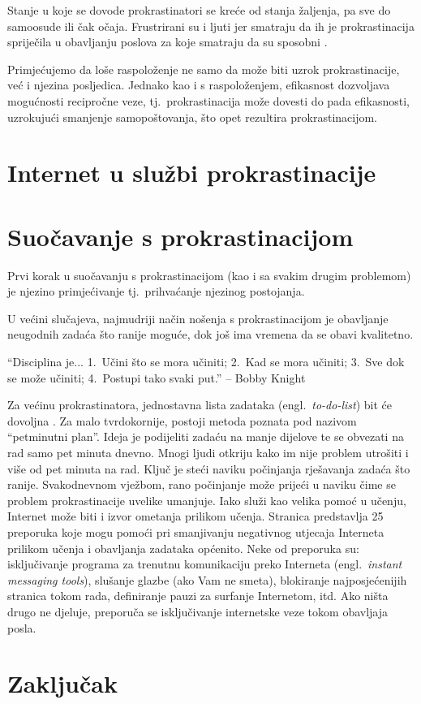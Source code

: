 \documentclass[11pt,twocolumn,english]{article}
\newcommand{\engl}[1]{(engl.~\emph{#1})}
\begin{document}
Stanje u koje se dovode prokrastinatori se kreće od
stanja žaljenja, pa sve do samoosude ili čak očaja. Frustrirani su i ljuti jer
smatraju da ih je prokrastinacija spriječila u obavljanju poslova za koje
smatraju da su sposobni \cite{burka2004procrastination}.

Primjećujemo da loše raspoloženje ne samo da može biti
uzrok prokrastinacije, već i njezina posljedica. Jednako kao i s raspoloženjem,
efikasnost dozvoljava mogućnosti recipročne veze, tj.~prokrastinacija može
dovesti do pada efikasnosti, uzrokujući smanjenje samopoštovanja, što opet
rezultira prokrastinacijom.


\section{Internet u službi prokrastinacije}


\section{Suočavanje s prokrastinacijom}

Prvi korak u suočavanju s prokrastinacijom (kao i sa svakim drugim problemom)
je njezino primjećivanje tj.~prihvaćanje njezinog postojanja. 

U većini slučajeva, najmudriji način nošenja s prokrastinacijom je obavljanje
neugodnih zadaća što ranije moguće, dok još ima vremena da se obavi kvalitetno.

``Disciplina je... 1.~Učini što se mora učiniti; 2.~Kad se mora učiniti; 3.~Sve
dok se može učiniti; 4.~Postupi tako svaki put.'' -- Bobby Knight  

Za većinu prokrastinatora, jednostavna lista zadataka \engl{to-do-list}
bit će dovoljna \cite{TuckerPsySelfHelp}. Za malo tvrdokornije, postoji metoda
poznata pod nazivom ``petminutni plan''. Ideja je podijeliti zadaću na manje
dijelove te se obvezati na rad samo pet minuta dnevno. Mnogi ljudi otkriju kako
im nije problem utrošiti i više od pet minuta na rad. Ključ je steći naviku
počinjanja rješavanja zadaća što ranije. Svakodnevnom vježbom, rano počinjanje
može prijeći u naviku čime se problem prokrastinacije uvelike umanjuje. Iako
služi kao velika pomoć u učenju, Internet može biti i izvor ometanja prilikom
učenja. Stranica \cite{ColDeg25ways} predstavlja 25 preporuka koje mogu pomoći
pri smanjivanju negativnog utjecaja Interneta prilikom učenja i obavljanja
zadataka općenito. Neke od preporuka su: isključivanje programa za trenutnu
komunikaciju preko Interneta \engl{instant messaging tools}, slušanje
glazbe (ako Vam ne smeta), blokiranje najposjećenijih stranica tokom rada, definiranje
pauzi za surfanje Internetom, itd. Ako ništa drugo ne djeluje, preporuča se
isključivanje internetske veze tokom obavljaja posla.


\section{Zaključak}




\end{document}
